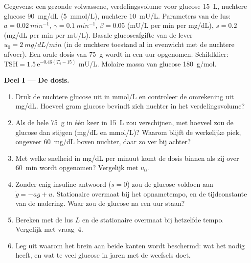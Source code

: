 \begin{problem}
\label{pb:b3:endocrinology:1}
Gegevens: een gezonde volwassene, verdelingsvolume voor glucose
\qty{15}{L}, nuchtere glucose \qty{90}{mg/dL} (\qty{5}{mmol/L}),
nuchtere  \qty{10}{mU/L}. Parameters van de lus: $a = \qty{0.02}{min^{-1}}$, $\gamma =
\qty{0.1}{min^{-1}}$, $\beta = 0.05$ (mU/L per min per mg/dL), $s = 0.2$
(mg/dL per min per mU/L). Basale glucoseafgifte van de lever $u_{0} =
\qty{2}{mg/dL/min}$ (in de nuchtere toestand al in evenwicht met de
nuchtere afvoer). Een orale dosis van \qty{75}{g} wordt in een uur
opgenomen. Schildklier: $\text{TSH} = 1.5\,\mathrm{e}^{-0.46(T_{4} - 15)}$ mU/L.
Molaire massa van glucose \qty{180}{g/mol}.

\medskip
\noindent\textbf{Deel I --- De dosis.}
\begin{enumerate}
  \item Druk de nuchtere glucose uit in mmol/L en controleer de
        omrekening uit mg/dL. Hoeveel gram glucose bevindt zich nuchter
        in het verdelingsvolume?
  \item Als de hele \qty{75}{g} in één keer in \qty{15}{L} zou
        verschijnen, met hoeveel zou de glucose dan stijgen (mg/dL en
        mmol/L)? Waarom blijft de werkelijke piek, ongeveer
        \qty{60}{mg/dL} boven nuchter, daar zo ver bij achter?
  \item Met welke snelheid in mg/dL per minuut komt de dosis binnen als
        zij over \qty{60}{min} wordt opgenomen? Vergelijk met $u_{0}$.
  \item Zonder enig insuline-antwoord ($s = 0$) zou de glucose voldoen aan $\dot
        g = -a g + u$. Stationaire overmaat bij het opnametempo, en de
        tijdconstante van de nadering. Waar zou de glucose na een uur
        staan?
  \item Bereken met de lus $L$ en de stationaire overmaat bij hetzelfde
        tempo. Vergelijk met vraag~4.
  \item Leg uit waarom het brein aan beide kanten wordt beschermd: wat
        het nodig heeft, en wat te veel glucose in jaren met de weefsels doet.
\end{enumerate}


\end{problem}
